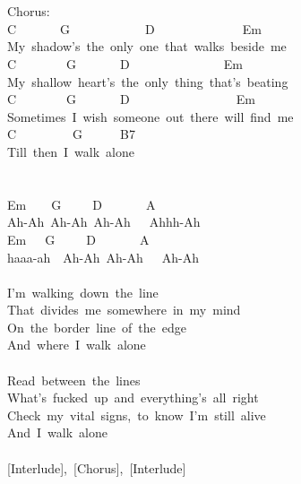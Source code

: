 \documentclass[]{book}
\begin{document}
~\\
~\\
Chorus:\\
C~~~~~~~G~~~~~~~~~~~~D~~~~~~~~~~~~~~Em\\
\hspace*{0.333em}\hspace*{0.333em}\hspace*{0.333em}\hspace*{0.333em}My~shadow's~the~only~one~that~walks~beside~me\\
C~~~~~~~~G~~~~~~~D~~~~~~~~~~~~~~~Em\\
\hspace*{0.333em}\hspace*{0.333em}\hspace*{0.333em}\hspace*{0.333em}My~shallow~heart's~the~only~thing~that's~beating\\
C~~~~~~~~G~~~~~~~D~~~~~~~~~~~~~~~~~Em\\
\hspace*{0.333em}\hspace*{0.333em}\hspace*{0.333em}\hspace*{0.333em}Sometimes~I~wish~someone~out~there~will~find~me\\
C~~~~~~~~~G~~~~~~B7\\
\hspace*{0.333em}\hspace*{0.333em}\hspace*{0.333em}\hspace*{0.333em}Till~then~I~walk~alone\\
~\\
~\\
\hspace*{0.333em}Em~~~~G~~~~~D~~~~~~~A\\
Ah-Ah~Ah-Ah~Ah-Ah~~~Ahhh-Ah\\
\hspace*{0.333em}\hspace*{0.333em}\hspace*{0.333em}\hspace*{0.333em}\hspace*{0.333em}Em~~~G~~~~~D~~~~~~~A\\
haaa-ah~~Ah-Ah~Ah-Ah~~~Ah-Ah\\
~\\
I'm~walking~down~the~line\\
That~divides~me~somewhere~in~my~mind\\
On~the~border~line~of~the~edge\\
And~where~I~walk~alone\\
~\\
Read~between~the~lines\\
What's~fucked~up~and~everything's~all~right\\
Check~my~vital~signs,~to~know~I'm~still~alive\\
And~I~walk~alone\\
~\\
{[}Interlude{]},~{[}Chorus{]},~{[}Interlude{]}\\
~\\
~\\
\end{document}
